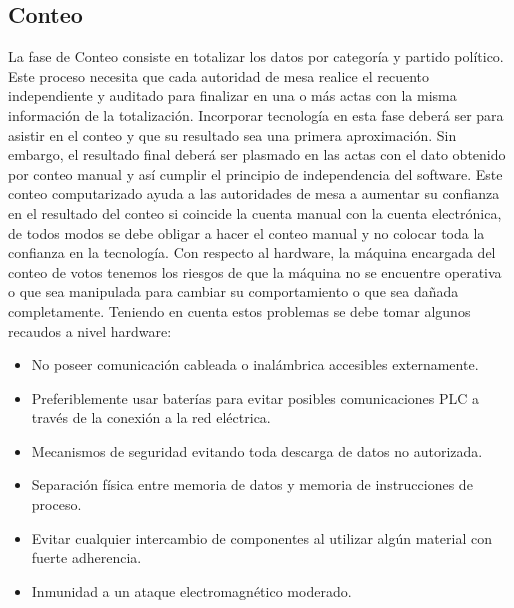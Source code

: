 \subsection{Conteo} 
La fase de Conteo consiste en totalizar los datos por categoría y partido político. Este proceso necesita que cada autoridad de mesa realice el recuento independiente y auditado para finalizar en una o más actas con la misma información de la totalización. Incorporar tecnología en esta fase deberá ser para asistir en el conteo y que su resultado sea una primera aproximación. Sin embargo, el resultado final deberá ser plasmado en las actas con el dato obtenido por conteo manual y así cumplir el principio de independencia del software. 
Este conteo computarizado ayuda a las autoridades de mesa a aumentar su confianza en el resultado del conteo si coincide la cuenta manual con la cuenta electrónica, de todos modos se debe obligar a hacer el conteo manual y no colocar toda la confianza en la tecnología.
Con respecto al hardware, la máquina encargada del conteo de votos tenemos los riesgos de que la máquina no se encuentre operativa o que sea manipulada para cambiar su comportamiento o que sea dañada completamente. Teniendo en cuenta estos problemas se debe tomar algunos recaudos a nivel hardware:
    \begin{itemize}
        \item No poseer comunicación cableada o inalámbrica accesibles externamente.
        \item Preferiblemente usar baterías para evitar posibles comunicaciones PLC a través de la conexión a la red eléctrica.
        \item Mecanismos de seguridad evitando toda descarga de datos no autorizada.
        \item Separación física entre memoria de datos y memoria de instrucciones de proceso.
        \item Evitar cualquier intercambio de componentes al utilizar algún material con fuerte adherencia.
        \item Inmunidad a un ataque electromagnético moderado.
    \end{itemize}
    
